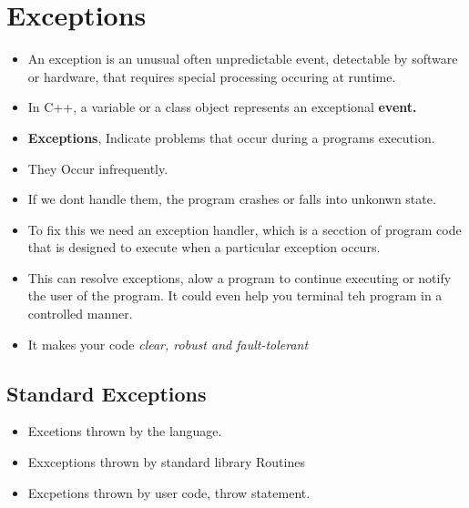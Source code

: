 \documentclass[11pt]{article}
\begin{document}
\clearpage
\tableofcontents
\clearpage


\section{Exceptions}
\begin{itemize}
	\item An exception is an unusual often unpredictable event, detectable by software or hardware, that requires special processing occuring at runtime. 
	\item In C++, a variable or a class object represents an exceptional \textbf{event.}
	\item \textbf{Exceptions}, Indicate problems that occur during a programs execution. 
	\item They Occur infrequently. 
	\item If we dont handle them, the program crashes or falls into unkonwn state.
	\item To fix this we need an exception handler, which is a secction of program code that is designed to execute when a particular exception occurs. 
	\item This can resolve exceptions, alow a program to continue executing or notify the user of the program. It could even help you terminal teh program in a controlled manner. 
	\item It makes your code \textit{clear, robust and fault-tolerant}
\end{itemize}

\subsection{Standard Exceptions}
\begin{itemize}
	\item Excetions thrown by the language. 
	\item Exxceptions thrown by standard library Routines
	\item Excpetions thrown by user code, throw statement.
\end{itemize}
\end{document}
